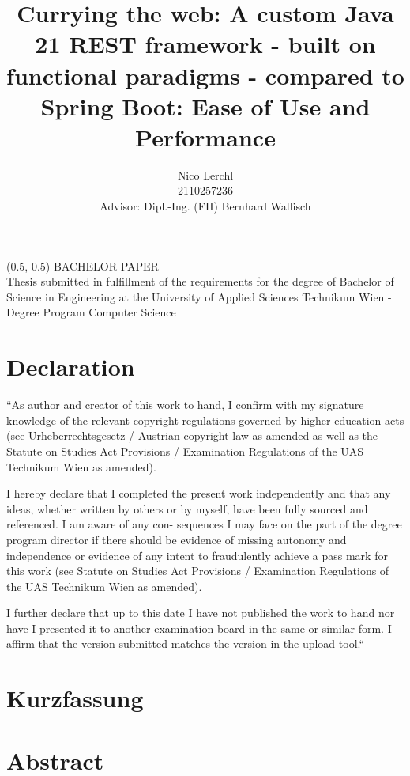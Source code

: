 \documentclass[a4paper]{article}
\title{
	Currying the web: A custom Java 21 REST framework - built on functional paradigms
	- compared to Spring Boot: Ease of Use and Performance
}
\author{Nico Lerchl\\2110257236\\[0.5cm]{\small Advisor: Dipl.-Ing. (FH) Bernhard Wallisch}}
\begin{document}
\begin{textblock}{15}(0.5, 0.5)
	\noindent\Large BACHELOR PAPER\\
	\large Thesis submitted in fulfillment of the requirements for the degree of Bachelor
	of Science in Engineering at the University of Applied Sciences Technikum Wien
	- Degree Program Computer Science\\
\end{textblock}

\maketitle

\newpage

\section*{Declaration}
“As author and creator of this work to hand, I confirm with my signature knowledge of the relevant
copyright regulations governed by higher education acts (see Urheberrechtsgesetz / Austrian
copyright law as amended as well as the Statute on Studies Act Provisions / Examination
Regulations of the UAS Technikum Wien as amended).\newline

\noindent I hereby declare that I completed the present work independently and that any ideas, whether
written by others or by myself, have been fully sourced and referenced. I am aware of any con-
sequences I may face on the part of the degree program director if there should be evidence of
missing autonomy and independence or evidence of any intent to fraudulently achieve a pass
mark for this work (see Statute on Studies Act Provisions / Examination Regulations of the UAS
Technikum Wien as amended).\newline

\noindent I further declare that up to this date I have not published the work to hand nor have I presented
it to another examination board in the same or similar form. I affirm that the version submitted
matches the version in the upload tool.“

\newpage

\section*{Kurzfassung}
\blindtext

\newpage

\section*{Abstract}
\blindtext
\end{document}

